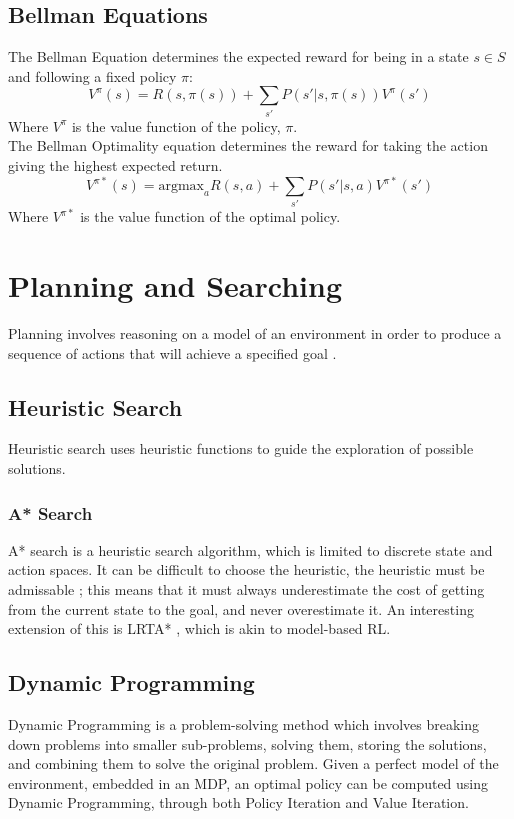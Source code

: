 \subsection{Bellman Equations}
The Bellman Equation determines the expected reward for being in a state $s \in S$ and following a fixed policy $\pi$:
$$V^\pi(s) = R(s, \pi(s)) + \sum_{s'}P(s'|s,\pi(s))V^\pi(s')$$
Where $V^\pi$ is the value function of the policy, $\pi$.\\
The Bellman Optimality equation determines the reward for taking the action giving the highest expected return.
$$V^{\pi*}(s) = \text{argmax}_a{R(s,a) + \sum_{s'}P(s'|s,a)V^{\pi*}(s')}$$
Where $V^{\pi*}$ is the value function of the optimal policy.

\section{Planning and Searching}
Planning involves reasoning on a model of an environment in order to produce a sequence of actions that will achieve a specified goal \cite{DBLP:books/aw/RN2020, Lav06, GhallabNauTraverso04}.
\subsection{Heuristic Search}
Heuristic search uses heuristic functions to guide the exploration of possible solutions.
\subsubsection{A* Search}
A* search is a heuristic search algorithm, which is limited to discrete state and action spaces. It can be difficult to choose the heuristic, the heuristic must be admissable \cite{DBLP:books/aw/RN2020}; this means that it must always underestimate the cost of getting from the current state to the goal, and never overestimate it. An interesting extension of this is LRTA* \cite{KORF1990189}, which is akin to model-based RL.
\subsection{Dynamic Programming}
Dynamic Programming \cite{Bellman:1957, DBLP:books/lib/Bertsekas05} is a problem-solving method which involves breaking down problems into smaller sub-problems, solving them, storing the solutions, and combining them to solve the original problem. Given a perfect model of the environment, embedded in an MDP, an optimal policy can be computed using Dynamic Programming, through both Policy Iteration  and Value Iteration.
